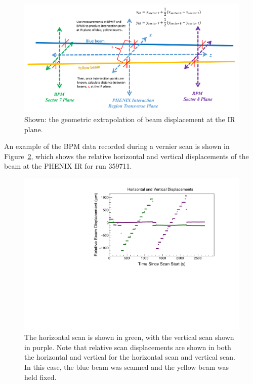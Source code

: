 \begin{figure}[ht]
\begin{center}
\includegraphics[width=1.0\linewidth]{./figures/bpm_ir_beam_separation}
\caption{
  Shown: the geometric extrapolation of beam displacement at the IR plane.
}
\label{fig:bpm_ir_xing_cartoon}
\end{center}
\end{figure}

An example of the BPM data recorded during a vernier scan is shown in
Figure~\ref{fig:bpm_data_run359711}, which shows the relative horizontal
and vertical displacements of the beam at the PHENIX IR for run 359711.

\begin{figure}[ht]
  \centering
  \includegraphics[width=0.8\linewidth]{./figures/bpm_data_scan_359711.pdf}
  \caption{
    The horizontal scan is shown in green, with the vertical scan shown in
    purple. Note that relative scan displacements are shown in both the
    horizontal and vertical for the horizontal scan and vertical scan. In this
    case, the blue beam was scanned and the yellow beam was held fixed.
  }
  \label{fig:bpm_data_run359711}
\end{figure}

